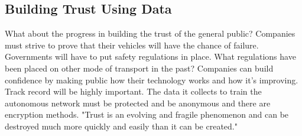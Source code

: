 \documentclass{article}
\begin{document}
\subsection{Building Trust Using Data}

What about the progress in building the trust of the general public? Companies must strive to prove that their vehicles will have the chance of failure. Governments will have to put safety regulations in place. What regulations have been placed on other mode of transport in the past? Companies can build confidence by making public how their technology works and how it’s improving. Track record will be highly important. The data it collects to train the autonomous network must be protected and be anonymous and there are encryption methods. "Trust is an
evolving and fragile phenomenon and can be destroyed much more quickly and easily than it can be created." \cite{hengstler2016applied}

\printbibliography
\end{document}
